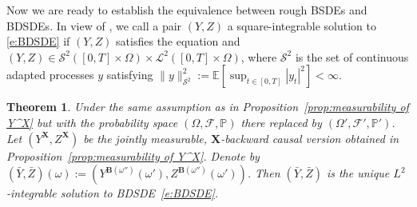 \documentclass[11pt,reqno]{amsart}
\newtheorem{theorem}[lemma]{Theorem}
\newcommand{\BX}{{\mathbf{X}}}
\newcommand{\BB}{{\mathbf{B}}}
\newcommand{\MF}{{\mathcal{F}}}
\numberwithin{equation}{section}
\def\PP{{\mathbb P}}
\def\E{\mathbb E}
\begin{document}
Now we are ready to establish the equivalence between rough BSDEs and BDSDEs. In view of \cite{PardouxPeng1994BDSDE}, we call a pair $(Y,Z) $ a square-integrable solution to \eqref{e:BDSDE} if $(Y,Z)$ satisfies the equation and $(Y,Z)\in \mathcal S^2([0,T]\times \Omega) \times \mathcal L^2([0,T]\times \Omega)$, where $\mathcal S^2$ is the set of continuous adapted processes $y$ satisfying $\|y\|_{\mathcal S^2}^2:= \E[\sup_{t\in [0,T]} |y_t|^2]<\infty. $  

\begin{theorem}\label{thm:BDSDE}
Under the same assumption as in Proposition~\ref{prop:measurability of Y^X} but with the probability space $(\Omega, \MF, \PP)$ there replaced by $(\Omega', \MF', \PP')$. Let $(  Y^{\mathbf X}, Z^{\mathbf X})$ be the jointly measurable, $\BX$-backward causal version obtained in Proposition~\ref{prop:measurability of Y^X}. Denote by $(\bar Y, \bar Z) (\omega):=  (Y^{ \mathbf B(\omega'')}(\omega'), Z^{\BB(\omega'')}(\omega') )$.
Then $(\bar Y, \bar Z)$ is the unique $L^2$-integrable solution to BDSDE~\eqref{e:BDSDE}. 
\end{theorem}
\end{document}
